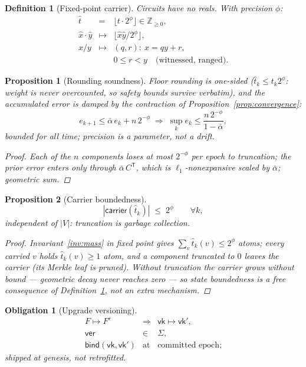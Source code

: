\documentclass[11pt,letterpaper]{article}
\newtheorem{definition}{Definition}
\newtheorem{proposition}{Proposition}
\newtheorem{obligation}{Obligation}
\begin{document}
\begin{definition}[Fixed-point carrier]\label{def:fixedpoint}
Circuits have no reals.  With precision $\phi$:
\[
\begin{array}{rcl}
\hat t&=&\lfloor t\cdot2^{\phi}\rfloor\in\mathbb{Z}_{\geq0},\\
\hat x\cdot\hat y&\mapsto&\lfloor\hat x\hat y/2^{\phi}\rfloor,\\
x/y&\mapsto&(q,r):\ x=qy+r,\\
&&0\leq r<y\quad\text{(witnessed, ranged)}.
\end{array}
\]
\end{definition}

\begin{proposition}[Rounding soundness]\label{prop:rounding}
Floor rounding is one-sided ($\hat t_k\leq t_k 2^{\phi}$: weight is never
overcounted, so safety bounds survive verbatim), and the accumulated
error is damped by the contraction of
Proposition~\ref{prop:convergence}:
\[
e_{k+1}\leq\bar\alpha\,e_k+n\,2^{-\phi}
\;\Rightarrow\;
\sup_k e_k\leq\frac{n\,2^{-\phi}}{1-\bar\alpha},
\]
bounded for all time; precision is a parameter, not a drift.
\begin{proof}
Each of the $n$ components loses at most $2^{-\phi}$ per epoch to
truncation; the prior error enters only through
$\bar\alpha\,C^{\mathsf T}$, which is $\ell_1$-nonexpansive scaled by
$\bar\alpha$; geometric sum.
\end{proof}
\end{proposition}

\begin{proposition}[Carrier boundedness]\label{prop:carrier}
\[
|\mathsf{carrier}(\hat t_k)|\;\leq\;2^{\phi}\qquad\forall k,
\]
independent of $|V|$: truncation is garbage collection.
\begin{proof}
Invariant~\ref{inv:mass} in fixed point gives
$\sum_v\hat t_k(v)\leq2^{\phi}$ atoms; every carried $v$ holds
$\hat t_k(v)\geq1$ atom, and a component truncated to $0$ leaves the
carrier (its Merkle leaf is pruned).  Without truncation the carrier
grows without bound --- geometric decay never reaches zero --- so
state boundedness is a free consequence of
Definition~\ref{def:fixedpoint}, not an extra mechanism.
\end{proof}
\end{proposition}

\begin{obligation}[Upgrade versioning]\label{obl:upgrade}
\[
\begin{array}{rcl}
F\mapsto F'&\Rightarrow&\mathsf{vk}\mapsto\mathsf{vk}',\\
\mathsf{ver}&\in&\Sigma,\\
\mathsf{bind}(\mathsf{vk},\mathsf{vk}')&\text{at}&
  \text{committed epoch};
\end{array}
\]
shipped at genesis, not retrofitted.
\end{obligation}
\end{document}
